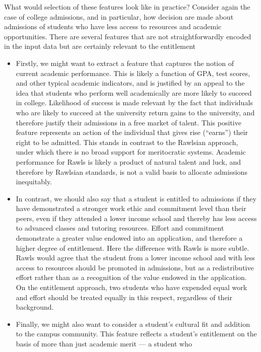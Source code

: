 What would selection of these features look like in practice? Consider again the case of
college admissions, and in particular, how decision are made about admissions of
students who have less access to resources and academic opportunities. There are
several features that are not straightforwardly encoded in the input data but
are certainly relevant to the entitlement
\begin{itemize}
    \item Firstly, we might want to extract a feature that captures the notion
    of current academic performance. This is likely a function of GPA, test
    scores, and other typical academic indicators, and is justified by an appeal
    to the idea that students who perform well academically are more likely to
    succeed in college. Likelihood of success is made relevant by the fact
    that individuals who are likely to succeed at the university return gains 
    to the university, and therefore justify their admissions in a free market
    of talent. This positive feature represents an action of the individual that
    gives rise (``earns'') their right to be admitted. This stands in contrast
    to the Rawlsian approach, under which there is no broad support for
    meritocratic systems. Academic performance for Rawls is likely a product of
    natural talent and luck, and therefore by Rawlsian standards, is not a valid
    basis to allocate admissions inequitably.
    \item In contrast, we should also say that a student is entitled to admissions if
    they have demonstrated a stronger work ethic and commitment level than their
    peers, even if they attended a lower income school and thereby has less 
    access to advanced classes and tutoring resources. Effort and commitment
    demonstrate a greater value endowed into an application, and therefore a
    higher degree of entitlement. Here the difference with Rawls is more subtle.
    Rawls would agree that the student from a lower income school and with less
    access to resources should be promoted in admissions, but as a redistributive
    effort rather than as a recognition of the value endowed in the application.
    On the entitlement approach, two students who have expended equal work and
    effort should be treated equally in this respect, regardless of their 
    background.
    \item Finally, we might also want to consider a student's cultural fit and
    addition to the campus community. This feature reflects a student's
    entitlement on the basis of more than just academic merit — a student who

\end{itemize}
